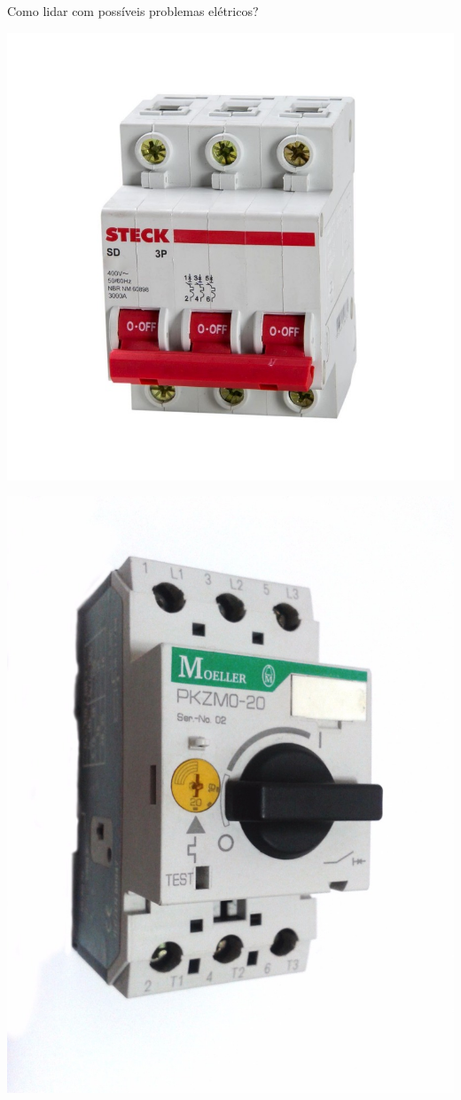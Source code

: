 \begin{frame}{Como lidar com possíveis problemas elétricos?}
\begin{minipage}{0.45\linewidth}
	\centering
	\includegraphics[width=\linewidth]{Figuras/Ch05/fig13.jpg}
\end{minipage}
\hfill
\begin{minipage}{0.45\linewidth}
	\centering
	\includegraphics[width=\linewidth]{Figuras/Ch05/fig14.jpg}

\end{minipage}
\end{frame}
